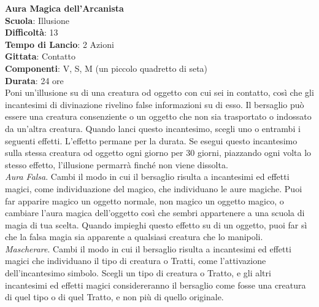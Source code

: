 \begin{multicols}{2}
\medskip\textbf{Aura Magica dell'Arcanista}\\
\textbf{Scuola}: Illusione\\
\textbf{Difficoltà}:  13\\
\textbf{Tempo di Lancio}: 2 Azioni\\
\textbf{Gittata}: Contatto\\
\textbf{Componenti}: V, S, M (un piccolo quadretto di seta)\\
\textbf{Durata}: 24 ore\\
Poni un'illusione su di una creatura od oggetto con cui sei in contatto, così che gli incantesimi di divinazione rivelino false informazioni su di esso. Il bersaglio può essere una creatura consenziente o un oggetto che non sia trasportato o indossato da un'altra creatura. Quando lanci questo incantesimo, scegli uno o entrambi i seguenti effetti. L’effetto permane per la durata. Se esegui questo incantesimo sulla stessa creatura od oggetto ogni giorno per 30 giorni, piazzando ogni volta lo stesso effetto, l’illusione permarrà finché non viene dissolta.\\
\textit{Aura Falsa}. Cambi il modo in cui il bersaglio risulta a incantesimi ed effetti magici, come individuazione del magico, che individuano le aure magiche. Puoi far apparire magico un oggetto normale, non magico un oggetto magico, o cambiare l’aura magica dell'oggetto così che sembri appartenere a una scuola di magia di tua scelta. Quando impieghi questo effetto su di un oggetto, puoi far sì che la falsa magia sia apparente a qualsiasi creatura che lo manipoli.\\ \textit{Mascherare}. Cambi il modo in cui il bersaglio risulta a incantesimi ed effetti magici che individuano il tipo di creatura o Tratti, come l’attivazione dell'incantesimo simbolo. Scegli un tipo di creatura o Tratto, e gli altri incantesimi ed effetti magici considereranno il bersaglio come fosse una creatura di quel tipo o di quel Tratto, e non più di quello originale.


\end{multicols}
